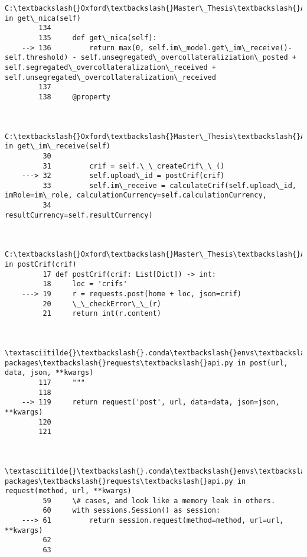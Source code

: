 \begin{Verbatim}[commandchars=\\\{\}]
        C:\textbackslash{}Oxford\textbackslash{}Master\_Thesis\textbackslash{}Allocation\_Thesis\textbackslash{}SA\_CCR\_Allocation\textbackslash{}src\textbackslash{}collateralAgreement\textbackslash{}collateralAgreement.py in get\_nica(self)
        134 
        135     def get\_nica(self):
    --> 136         return max(0, self.im\_model.get\_im\_receive()-self.threshold) - self.unsegregated\_overcollateraliziation\_posted + self.segregated\_overcollateralization\_received + self.unsegregated\_overcollateralization\_received
        137 
        138     @property
    

        C:\textbackslash{}Oxford\textbackslash{}Master\_Thesis\textbackslash{}Allocation\_Thesis\textbackslash{}SA\_CCR\_Allocation\textbackslash{}src\textbackslash{}margining\textbackslash{}simm.py in get\_im\_receive(self)
         30 
         31         crif = self.\_\_createCrif\_\_()
    ---> 32         self.upload\_id = postCrif(crif)
         33         self.im\_receive = calculateCrif(self.upload\_id, imRole=im\_role, calculationCurrency=self.calculationCurrency,
         34                                         resultCurrency=self.resultCurrency)
    

        C:\textbackslash{}Oxford\textbackslash{}Master\_Thesis\textbackslash{}Allocation\_Thesis\textbackslash{}SA\_CCR\_Allocation\textbackslash{}src\textbackslash{}margining\textbackslash{}simmAPI.py in postCrif(crif)
         17 def postCrif(crif: List[Dict]) -> int:
         18     loc = 'crifs'
    ---> 19     r = requests.post(home + loc, json=crif)
         20     \_\_checkError\_\_(r)
         21     return int(r.content)
    

        \textasciitilde{}\textbackslash{}.conda\textbackslash{}envs\textbackslash{}SACCRconda\textbackslash{}lib\textbackslash{}site-packages\textbackslash{}requests\textbackslash{}api.py in post(url, data, json, **kwargs)
        117     """
        118 
    --> 119     return request('post', url, data=data, json=json, **kwargs)
        120 
        121 
    

        \textasciitilde{}\textbackslash{}.conda\textbackslash{}envs\textbackslash{}SACCRconda\textbackslash{}lib\textbackslash{}site-packages\textbackslash{}requests\textbackslash{}api.py in request(method, url, **kwargs)
         59     \# cases, and look like a memory leak in others.
         60     with sessions.Session() as session:
    ---> 61         return session.request(method=method, url=url, **kwargs)
         62 
         63 
    


\end{Verbatim}
